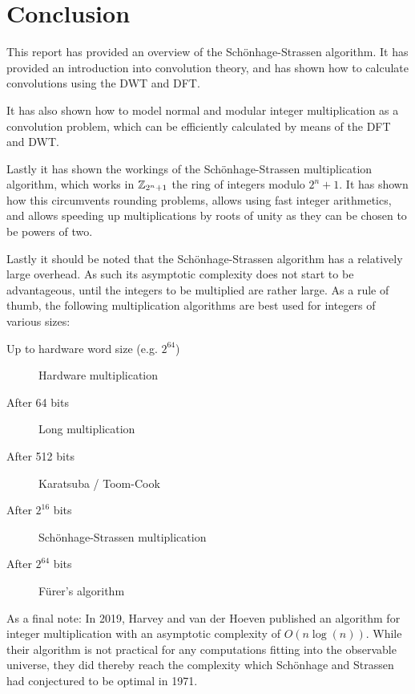 \chapter{Conclusion}
\label{chapter:conclusion}

This report has provided an overview of the Schönhage-Strassen algorithm. It
has provided an introduction into convolution theory, and has shown how to
calculate convolutions using the DWT and DFT.

It has also shown how to model normal and modular integer multiplication as a
convolution problem, which can be efficiently calculated by means of the DFT
and DWT.

Lastly it has shown the workings of the Schönhage-Strassen multiplication
algorithm, which works in $\mathbb{Z}_{2^n + 1}$ the ring of integers modulo $2^n
+ 1$. It has shown how this circumvents rounding problems, allows using fast
integer arithmetics, and allows speeding up multiplications by roots of unity
as they can be chosen to be powers of two.

Lastly it should be noted that the Schönhage-Strassen algorithm has a
relatively large overhead. As such its asymptotic complexity does not start to
be advantageous, until the integers to be multiplied are rather large. As a
rule of thumb, the following multiplication algorithms are best used for
integers of various sizes:

\begin{description}
		\item[Up to hardware word size (e.g. $2^{64}$)] Hardware multiplication
		\item[After 64 bits] Long multiplication
		\item[After 512 bits] Karatsuba / Toom-Cook
		\item[After $2^{16}$ bits] Schönhage-Strassen multiplication
		\item[After $2^{64}$ bits] Fürer's algorithm
\end{description}

As a final note: In 2019, Harvey and van der Hoeven published an algorithm for
integer multiplication with an asymptotic complexity of $O(n \log(n))$.
\autocite{harveyIntegerMultiplicationTime2021} While their algorithm is not
practical for any computations fitting into the observable universe, they did
thereby reach the complexity which Schönhage and Strassen had conjectured to be
optimal in 1971.

